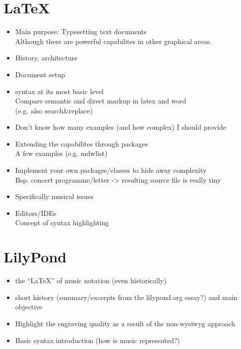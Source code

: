 \documentclass[../../LilyPond-Tutorials]{subfiles}
\begin{document}
\chapter{\LaTeX}
\begin{itemize}
\item Main purpose: Typesetting text documents\\
Although there are powerful capabilites in other graphical areas.
\item History, architecture
\item Document setup
\item syntax at its most basic level\\
Compare semantic and direct markup in latex and word\\
(e.g. also search\&replace)
\item Don't know how many examples (and how complex) I should provide
\item Extending the capabilites through packages\\
A few examples (e.g. mdwlist)
\item Implement your own packages/classes to hide away complexity\\
Bsp. concert programme/letter -> resulting source file is really tiny
\item Specifically musical issues
\item Editors/IDEs\\
Concept of syntax highlighting
\end{itemize}

\chapter{LilyPond}
\begin{itemize}
\item the “\LaTeX” of music notation (even historically)
\item short history (summary/excerpts from the lilypond.org essay?) and main objective
\item Highlight the engraving quality as a result of the non-wysiwyg approach
\item Basic syntax introduction (how is music represented?)
\end{itemize}
\end{document}
